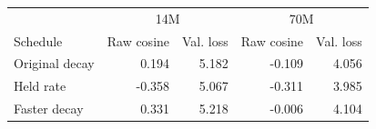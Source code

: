 \begin{tabular}{lrrrr}
\hline
& \multicolumn{2}{c}{14M} & \multicolumn{2}{c}{70M} \\
Schedule & Raw cosine & Val. loss & Raw cosine & Val. loss \\
\hline
Original decay & 0.194 & 5.182 & -0.109 & 4.056 \\
Held rate & -0.358 & 5.067 & -0.311 & 3.985 \\
Faster decay & 0.331 & 5.218 & -0.006 & 4.104 \\
\hline
\end{tabular}
